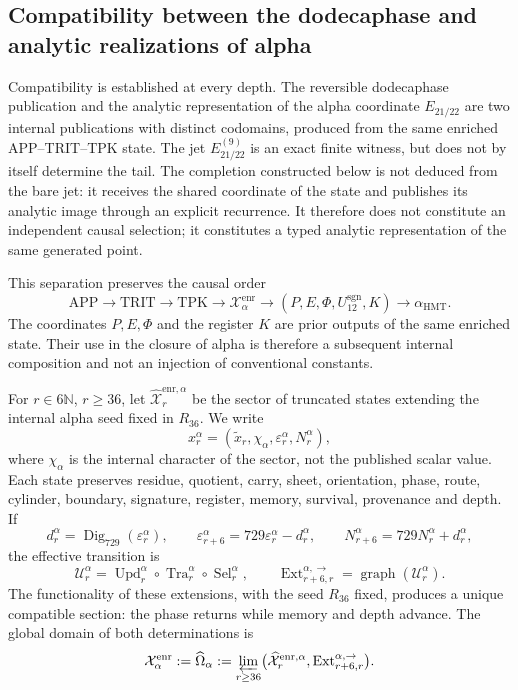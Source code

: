 \subsection{Compatibility between the dodecaphase and analytic realizations of alpha}
\label{ix:subsec:alpha-limite-dos-vias}

Compatibility is established at every depth. The reversible dodecaphase
publication and the analytic representation of the alpha
coordinate
\(E_{21/22}\) are two internal publications with distinct codomains,
produced from the same enriched APP--TRIT--TPK state. The jet
\(E_{21/22}^{(9)}\) is an exact finite witness, but does not by itself determine
the tail. The completion constructed below is not deduced from the bare
jet: it receives the shared coordinate of the state and publishes its analytic
image through an explicit recurrence. It therefore does not constitute an
independent causal selection; it constitutes a typed analytic representation
of the same generated point.

This separation preserves the causal order
\[
 \mathrm{APP}\longrightarrow\mathrm{TRIT}\longrightarrow\mathrm{TPK}
 \longrightarrow\mathcal X_{\alpha}^{\mathrm{enr}}
 \longrightarrow (P,E,\Phi,U_{12}^{\mathrm{sgn}},K)
 \longrightarrow\alpha_{\mathrm{HMT}}.
\]
The coordinates \(P,E,\Phi\) and the register \(K\) are prior outputs of the same enriched state. Their use in the closure of alpha is therefore a subsequent internal composition and not an injection of conventional constants.

For \(r\in6\mathbb N\), \(r\ge36\), let \(\widehat{\mathcal X}^{\mathrm{enr},\alpha}_r\) be the sector of truncated states extending the internal alpha seed fixed in \(R_{36}\). We write
\[
 x_r^\alpha=(\widetilde x_r,\chi_\alpha,
              \varepsilon_r^\alpha,N_r^\alpha),
\]
where \(\chi_\alpha\) is the internal character of the sector, not the published scalar
value. Each state preserves residue, quotient, carry, sheet, orientation,
phase, route, cylinder, boundary, signature, register, memory, survival,
provenance and depth. If
\[
 d_r^\alpha=\operatorname{Dig}_{729}(\varepsilon_r^\alpha),\qquad
 \varepsilon_{r+6}^\alpha=729\varepsilon_r^\alpha-d_r^\alpha,
 \qquad N_{r+6}^\alpha=729N_r^\alpha+d_r^\alpha,
\]
the effective transition is
\[
 \mathcal U_r^\alpha=
 \operatorname{Upd}_r^\alpha\circ
 \operatorname{Tra}_r^\alpha\circ
 \operatorname{Sel}_r^\alpha,
 \qquad
 \operatorname{Ext}^{\alpha,\to}_{r+6,r}
 =\operatorname{graph}(\mathcal U_r^\alpha).
\]
The functionality of these extensions, with the seed \(R_{36}\) fixed, produces a unique compatible section: the phase returns while memory and depth advance. The global domain of both determinations is
\begin{equation}
 \mathcal X_\alpha^{\mathrm{enr}}:=\widehat\Omega_\alpha
 :=\varprojlim_{r\ge36}
 \bigl(\widehat{\mathcal X}^{\mathrm{enr},\alpha}_r,
       \operatorname{Ext}^{\alpha,\to}_{r+6,r}\bigr).
 \label{ix:eq:alpha-dominio-enriquecido-completo}
\end{equation}

